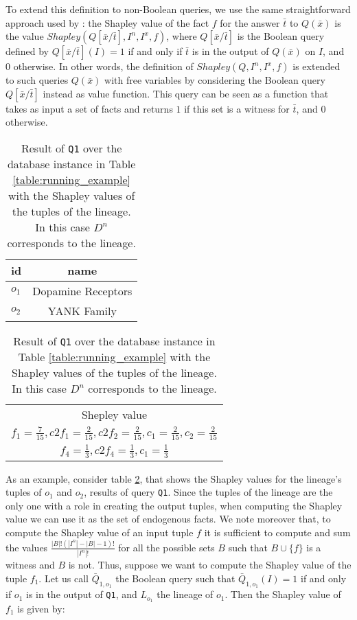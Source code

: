 To extend this definition to non-Boolean queries, we use the same straightforward approach used by \citet{DFKM22}: the Shapley value of the fact $f$ for the answer $\bar{t}$ to $Q(\bar{x})$ is the value $Shapley(Q[\bar{x} / \bar{t}], I^n, I^x, f)$, where $Q[\bar{x} / \bar{t}]$ is the Boolean query defined by $Q[\bar{x} / \bar{t}](I) = 1$ if and only if $\bar{t}$ is in the output of $Q(\bar{x})$ on $I$, and $0$ otherwise.
In other words, the definition of $Shapley(Q, I^n, I^x, f)$ is extended to such queries $Q(\bar{x})$ with free variables by considering the Boolean query $Q[\bar{x} / \bar{t}]$ instead as value function. This query can be seen as a function that takes as input a set of facts and returns $1$ if this set is a witness for $\bar{t}$, and $0$ otherwise.

\begin{table}[]
\footnotesize
\centering
  \begin{tabular}{|l|c|}
  \hline
    id & name\\
    \hline
    $o_1$ &  Dopamine Receptors\\
    $o_2$ & YANK Family\\
    \hline
  \end{tabular}
  \begin{tabular}{c}
  	Shepley value   \\
  	$f_1=\frac{7}{15}, c2f_1=\frac{2}{15}, c2f_2=\frac{2}{15}, c_1=\frac{2}{15}, c_2=\frac{2}{15}$ \\
  	$f_4=\frac{1}{3}, c2f_4=\frac{1}{3}, c_1=\frac{1}{3}$ \\
  \end{tabular}
    \caption{Result of \texttt{Q1} over the database instance in Table \ref{table:running_example} with the Shapley values of the tuples of the lineage. In this case $D^n$ corresponds to the lineage.}
  \label{table:result_shapley}
\end{table} 

As an example, consider table \ref{table:result_shapley}, that shows the Shapley values for the lineage's tuples of $o_1$ and $o_2$, results of query \texttt{Q1}. 
Since the tuples of the lineage are the only one with a role in creating the output tuples, when computing the Shapley value we can use it as the set of endogenous facts.
We note moreover that, to compute the Shapley value of an input tuple $f$ it is sufficient to compute and sum the values $\frac{|B|!(|I^n| - |B| - 1)!}{|I^n|!}$ for all the possible sets $B$ such that $B \cup \{f\}$ is a witness and $B$ is not. 
Thus, suppose we want to compute the Shapley value of the tuple $f_1$. Let us call $\bar{Q}_{1, o_1}$ the Boolean query such that $\bar{Q}_{1, o_1}(I) = 1$ if and only if $o_1$ is in the output of \texttt{Q1}, and $L_{o_1}$ the lineage of $o_1$.
Then the Shapley value of $f_1$ is given by:

